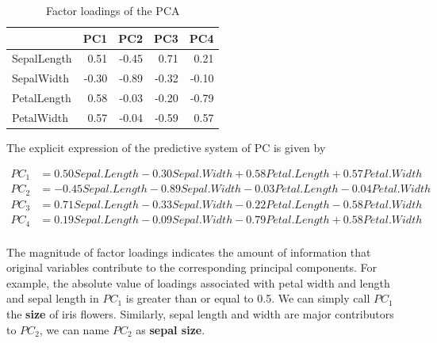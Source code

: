\documentclass[
]{book}
\newenvironment{Shaded}{\begin{snugshade}}{\end{snugshade}}
\newcommand{\AttributeTok}[1]{\textcolor[rgb]{0.13,0.29,0.53}{#1}}
\newcommand{\DecValTok}[1]{\textcolor[rgb]{0.00,0.00,0.81}{#1}}
\newcommand{\FunctionTok}[1]{\textcolor[rgb]{0.13,0.29,0.53}{\textbf{#1}}}
\newcommand{\NormalTok}[1]{#1}
\newcommand{\SpecialCharTok}[1]{\textcolor[rgb]{0.81,0.36,0.00}{\textbf{#1}}}
\newcommand{\StringTok}[1]{\textcolor[rgb]{0.31,0.60,0.02}{#1}}
\begin{document}
\begin{Shaded}
\end{Shaded}

\begin{table}

\caption{\label{tab:unnamed-chunk-214}Factor loadings of the PCA}
\centering
\begin{tabular}[t]{l|r|r|r|r}
\hline
  & PC1 & PC2 & PC3 & PC4\\
\hline
SepalLength & 0.51 & -0.45 & 0.71 & 0.21\\
\hline
SepalWidth & -0.30 & -0.89 & -0.32 & -0.10\\
\hline
PetalLength & 0.58 & -0.03 & -0.20 & -0.79\\
\hline
PetalWidth & 0.57 & -0.04 & -0.59 & 0.57\\
\hline
\end{tabular}
\end{table}

The explicit expression of the predictive system of PC is given by

\[
 \begin{aligned}
PC_1 & = 0.50 Sepal.Length -0.30 Sepal.Width + 0.58 Petal.Length + 0.57 Petal.Width  \\
PC_2 & = -0.45 Sepal.Length - 0.89 Sepal.Width -0.03 Petal.Length - 0.04 Petal.Width \\
PC_3 & = 0.71 Sepal.Length -0.33 Sepal.Width - 0.22  Petal.Length - 0.58 Petal.Width \\
PC_4 & = 0.19 Sepal.Length -0.09 Sepal.Width -0.79 Petal.Length + 0.58 Petal.Width   \\
\end{aligned}
\]

The magnitude of factor loadings indicates the amount of information that original variables contribute to the corresponding principal components. For example, the absolute value of loadings associated with petal width and length and sepal length in \(PC_1\) is greater than or equal to 0.5. We can simply call \(PC_1\) the \textbf{size} of iris flowers. Similarly, sepal length and width are major contributors to \(PC_2\), we can name \(PC_2\) as \textbf{sepal size}.
\end{document}
